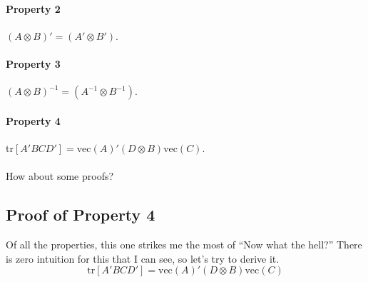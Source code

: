\documentclass[a4paper,12pt]{scrartcl}
\begin{document}
\paragraph{Property 2} $(A\otimes B)' = (A' \otimes B')$.

\paragraph{Property 3} $(A\otimes B)^{-1} = (A^{-1} \otimes B^{-1})$.

\paragraph{Property 4} 
tr$\left[A'BCD'\right] = \text{vec}(A)' (D \otimes B) \text{vec}(C)$.
\\
\\
How about some proofs?


\newpage
\subsection{Proof of Property 4}

Of all the properties, this one strikes me the most of 
``Now what the hell?''  There is zero intuition for this that
I can see, so let's try to derive it.
\begin{equation}
    \label{vecder}
    \text{tr}\left[A'BCD'\right] 
	= \text{vec}(A)' (D \otimes B) \text{vec}(C)
\end{equation}
\end{document}
